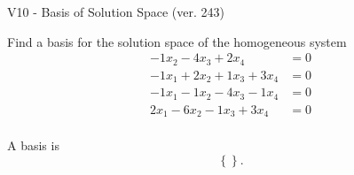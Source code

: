 \begin{exercise}
  \begin{exerciseTitle}V10 - Basis of Solution Space (ver. 243)\end{exerciseTitle}
  \begin{exerciseStatement}
    Find a basis for the solution space of the homogeneous system 
\begin{align*}
 -1 x_ 2 -4 x_ 3 + 2 x_ 4 &= 0  \\ 
  -1 x_ 1 + 2 x_ 2 + 1 x_ 3 + 3 x_ 4 &= 0  \\ 
  -1 x_ 1 -1 x_ 2 -4 x_ 3 -1 x_ 4 &= 0  \\ 
  2 x_ 1 -6 x_ 2 -1 x_ 3 + 3 x_ 4 &= 0  \\ 
 \end{align*}


 
  \end{exerciseStatement}

  \begin{exerciseAnswer}
   A basis is   
\[\left\{\right\}.\]

  


  \end{exerciseAnswer}
\end{exercise}